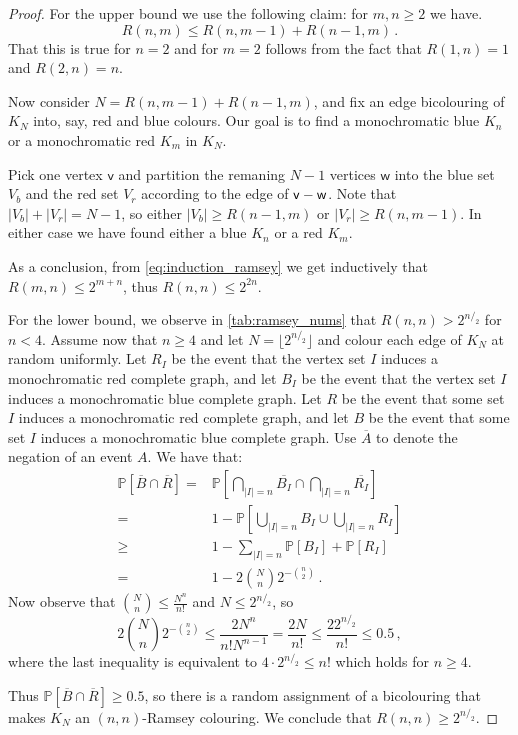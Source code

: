 \documentclass[12pt]{amsart}
\theoremstyle{definition}
\newcommand{\PP}{\mathbb{P}}
\newcommand{\vv}{\mathsf{v}}
\newcommand{\vw}{\mathsf{w}}
\begin{document}
\begin{proof}
For the upper bound we use the following claim: for $m, n \geq 2$ we have.
\begin{equation}\label{eq:induction_ramsey}
R(n, m) \leq R(n, m- 1) + R(n-1, m) \, .
\end{equation}
That this is true for $n = 2$ and for $m = 2$ follows from the fact that $R(1, n) = 1$ and $R(2, n) = n$.

Now consider $N = R(n, m- 1) + R(n-1, m)$, and fix an edge bicolouring of $K_N$ into, say, red and blue colours.
Our goal is to find a monochromatic blue $K_n $ or a monochromatic red $K_m$ in $K_N$.

Pick one vertex $\vv$ and partition the remaning $N-1$ vertices $\vw$ into the blue set $V_b$ and the red set $V_r$ according to the edge of $\vv \-- \vw$.
Note that $|V_b| + |V_r| = N-1$, so either $|V_b| \geq  R(n-1, m)$ or $|V_r| \geq  R(n, m- 1)$.
In either case we have found either a blue $K_n$ or a red $K_m$.

As a conclusion, from \eqref{eq:induction_ramsey} we get inductively that $R(m, n) \leq 2^{m+n}$, thus $R(n, n) \leq 2^{2n}$.


For the lower bound, we observe in \cref{tab:ramsey_nums} that $R(n, n) > 2^{n/_2}$ for $n < 4$. 
Assume now that $n\geq 4$ and let $N = \lfloor 2^{n/_2} \rfloor $ and colour each edge of $K_N$ at random uniformly.
Let $R_I$ be the event that the vertex set $I$ induces a monochromatic red complete graph, and let $B_I$ be the event that the vertex set $I$ induces a monochromatic blue complete graph.
Let $R$ be the event that some set $I$ induces a monochromatic red complete graph, and let $B$ be the event that some set $I$ induces a monochromatic blue complete graph.
Use $\overline{A}$ to denote the negation of an event $A$.
We have that:
\begin{align*}
\PP[\overline{B} \cap \overline{R}] =& \PP[\bigcap_{|I| = n} \overline{B_I} \cap \bigcap_{|I| = n} \overline{R_I}]\\
=& 1 - \PP[\bigcup_{|I| = n} B_I \cup \bigcup_{|I| = n} R_I]\\
\geq & 1 - \sum_{|I| = n} \PP[B_I] + \PP[R_I]\\
=& 1 - 2\binom{N}{n} 2^{-\binom{n}{2}}\, .
\end{align*}
Now observe that $\binom{N}{n} \leq\frac{N^n}{n!}$ and $N \leq 2^{n/_2}$, so
$$2\binom{N}{n} 2^{-\binom{n}{2}} \leq \frac{2 N^n}{n! N^{n-1}} = \frac{2N}{n!} \leq \frac{ 2 2^{n/_2}}{n!} \leq 0.5 \, ,$$
where the last inequality is equivalent to $4 \cdot 2^{n/_2} \leq n!$ which  holds for $n \geq 4$.

Thus $\PP[\overline{B} \cap \overline{R}]  \geq 0.5$, so there is a random assignment of a bicolouring that makes $K_N$ an $(n, n)$-Ramsey colouring.
We conclude that $R(n, n) \geq 2^{n/_2}$.
\end{proof}
\end{document}

